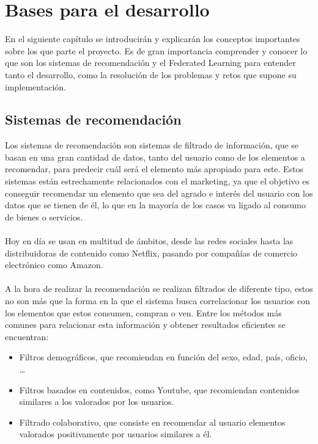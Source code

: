 \chapter{Bases para el desarrollo}
\thispagestyle{fancy}
En el siguiente capítulo se introducirán y explicarán los conceptos importantes sobre los que parte el proyecto. Es de gran importancia comprender y conocer lo que son los sistemas de recomendación y el Federated Learning para entender tanto el desarrollo, como la resolución de los problemas y retos que supone su implementación. 

\section{Sistemas de recomendación}
Los sistemas de recomendación son sistemas de filtrado de información, que se basan en una gran cantidad de datos, tanto del usuario como de los elementos a recomendar, para predecir cuál será el elemento más apropiado para este. Estos sistemas están estrechamente relacionados con el marketing, ya que el objetivo es conseguir recomendar un elemento que sea del agrado e interés del usuario con los datos que se tienen de él, lo que en la mayoría de los casos va ligado al consumo de bienes o servicios. 
\\ \\
Hoy en día se usan en multitud de ámbitos, desde las redes sociales hasta las distribuidoras de contenido como Netflix, pasando por compañías de comercio electrónico como Amazon. 
\\ \\
A la hora de realizar la recomendación se realizan filtrados de diferente tipo, estos no son más que la forma en la que el sistema busca correlacionar los usuarios con los elementos que estos consumen, compran o ven. Entre los métodos más comunes para relacionar esta información y obtener resultados eficientes se encuentran:
\begin{itemize}
    \item Filtros demográficos, que recomiendan en función del sexo, edad, país, oficio, … 
    \item Filtros basados en contenidos, como Youtube, que recomiendan contenidos similares a los valorados por los usuarios. 
    \item Filtrado colaborativo, que consiste en recomendar al usuario elementos valorados positivamente por usuarios similares a él. 
\end{itemize}


